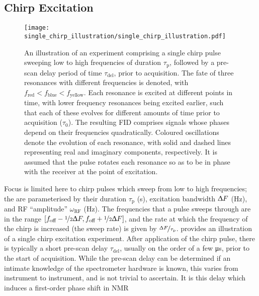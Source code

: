 \subsection{Chirp Excitation}
\begin{figure}
    \centering
    \texttt{[image: single\_chirp\_illustration/single\_chirp\_illustration.pdf]}
    \caption[
        An illustration of an experiment comprising a single chirp pulse.
    ]
    {
        An illustration of an experiment comprising a single chirp pulse sweeping
        low to high frequencies of duration $\tau_{\text{p}}$, followed by
        a pre-scan delay period of time $\tau_{\text{del}}$, prior to
        acquisition. The fate of three resonances with different frequencies is
        denoted, with $f_{\text{red}} < f_{\text{blue}} <
        f_{\text{yellow}}$. Each resonance is excited at different points
        in time, with lower frequency resonances being excited earlier, such that
        each of these evolves for different amounts of time prior
        to acquisition ($\tau_0$).
        The resulting \ac{FID} comprises signals whose phases depend on their
        frequencies quadratically.
        Coloured oscillations denote the evolution of each resonance, with
        solid and dashed lines representing real and imaginary components,
        respectively. It is assumed that the pulse rotates each
        resonance so as to be in phase with the receiver at the point of
        excitation.
    }
    \label{fig:single-chirp}
\end{figure}
Focus is limited here to chirp pulses which sweep from low to high
frequencies; the are parameterised by
their duration $\tau_{\text{p}}$ (\unit{\second}),
excitation bandwidth $\Updelta F$ (\unit{\hertz}),
and \ac{RF} ``amplitude'' $\omega_{\text{RF}}$ (\unit{\hertz}).
The frequencies that a pulse sweeps through are in the range
$[f_{\text{off}} - \nicefrac{1}{2} \Updelta F,
f_{\text{off}} + \nicefrac{1}{2} \Updelta F]$,
and the rate at which the frequency of the chirp is increased (the sweep
rate) is given by $\nicefrac{\Updelta F}{\tau_{\text{p}}}$.
 provides an illustration of a single chirp
excitation experiment. After application of the chirp pulse, there is typically
a short pre-scan delay $\tau_{\text{del}}$, usually on the order of a few
\unit{\micro\second}, prior to the start of acquisition. While the pre-scan
delay can be determined if an intimate knowledge of the spectrometer hardware
is known, this varies from instrument to instrument, and is not trivial to
ascertain. It is this delay which induces a first-order phase shift in \ac{NMR}
